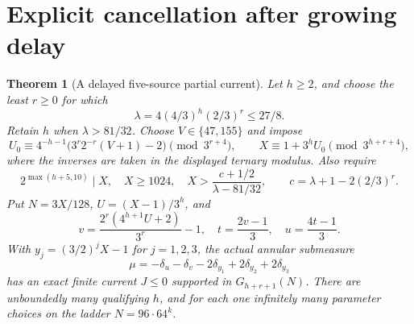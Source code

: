 \documentclass[11pt]{article}
\newtheorem{theorem}{Theorem}
\begin{document}
\section{Explicit cancellation after growing delay}

\begin{theorem}[A delayed five-source partial current]\label{thm:release}
Let $h\ge2$, and choose the least $r\ge0$ for which
\[
 \lambda=4(4/3)^h(2/3)^r\le27/8.
\]
Retain $h$ when $\lambda>81/32$. Choose $V\in\{47,155\}$ and impose
\[
 U_0\equiv4^{-h-1}\bigl(3^r2^{-r}(V+1)-2\bigr)
       \pmod{3^{r+4}},\qquad
 X\equiv1+3^hU_0\pmod{3^{h+r+4}},
\]
where the inverses are taken in the displayed ternary modulus. Also require
\[
 2^{\max(h+5,10)}\mid X,\quad X\ge1024,\quad
 X>\frac{c+1/2}{\lambda-81/32},\qquad
 c=\lambda+1-2(2/3)^r.
\]
Put $N=3X/128$, $U=(X-1)/3^h$, and
\[
 v=\frac{2^r(4^{h+1}U+2)}{3^r}-1,\quad
 t=\frac{2v-1}{3},\quad u=\frac{4t-1}{3}.
\]
With $y_j=(3/2)^jX-1$ for $j=1,2,3$, the actual annular submeasure
\[
 \mu=-\delta_u-\delta_v-2\delta_{y_1}
                   +2\delta_{y_2}+2\delta_{y_3}
\]
has an exact finite current $J\le0$ supported in $G_{h+r+1}(N)$.
There are unboundedly many qualifying $h$, and for each one infinitely
many parameter choices on the ladder $N=96\cdot64^k$.
\end{theorem}
\end{document}
